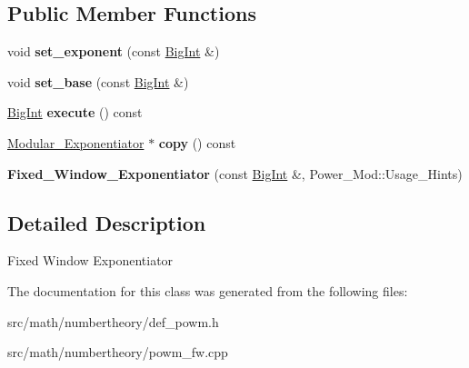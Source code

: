 \subsection*{Public Member Functions}
\begin{DoxyCompactItemize}
\item 
\hypertarget{classBotan_1_1Fixed__Window__Exponentiator_a29f232bb362730043697941e68edf868}{void {\bfseries set\-\_\-exponent} (const \hyperlink{classBotan_1_1BigInt}{Big\-Int} \&)}\label{classBotan_1_1Fixed__Window__Exponentiator_a29f232bb362730043697941e68edf868}

\item 
\hypertarget{classBotan_1_1Fixed__Window__Exponentiator_a306851dbb9edcbffe5dac3b73cfd1ad1}{void {\bfseries set\-\_\-base} (const \hyperlink{classBotan_1_1BigInt}{Big\-Int} \&)}\label{classBotan_1_1Fixed__Window__Exponentiator_a306851dbb9edcbffe5dac3b73cfd1ad1}

\item 
\hypertarget{classBotan_1_1Fixed__Window__Exponentiator_a9851b747f20e0e2c9cfd0beded9f95a8}{\hyperlink{classBotan_1_1BigInt}{Big\-Int} {\bfseries execute} () const }\label{classBotan_1_1Fixed__Window__Exponentiator_a9851b747f20e0e2c9cfd0beded9f95a8}

\item 
\hypertarget{classBotan_1_1Fixed__Window__Exponentiator_a0b47f83315904a59c643ad2c2dcdfbdd}{\hyperlink{classBotan_1_1Modular__Exponentiator}{Modular\-\_\-\-Exponentiator} $\ast$ {\bfseries copy} () const }\label{classBotan_1_1Fixed__Window__Exponentiator_a0b47f83315904a59c643ad2c2dcdfbdd}

\item 
\hypertarget{classBotan_1_1Fixed__Window__Exponentiator_a2d5e70193e06ebebe869a74d2e09b061}{{\bfseries Fixed\-\_\-\-Window\-\_\-\-Exponentiator} (const \hyperlink{classBotan_1_1BigInt}{Big\-Int} \&, Power\-\_\-\-Mod\-::\-Usage\-\_\-\-Hints)}\label{classBotan_1_1Fixed__Window__Exponentiator_a2d5e70193e06ebebe869a74d2e09b061}

\end{DoxyCompactItemize}


\subsection{Detailed Description}
Fixed Window Exponentiator 

The documentation for this class was generated from the following files\-:\begin{DoxyCompactItemize}
\item 
src/math/numbertheory/def\-\_\-powm.\-h\item 
src/math/numbertheory/powm\-\_\-fw.\-cpp\end{DoxyCompactItemize}
